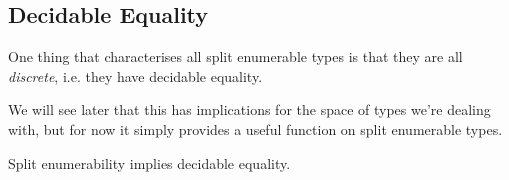 \subsection{Decidable Equality}
One thing that characterises all split enumerable types is that they are all
\emph{discrete}, i.e. they have decidable equality.  
\begin{multicols}{2}  \null \vfill
  \begin{agdalisting}
  \end{agdalisting} \vfill \null \columnbreak
  \begin{agdalisting}
  \end{agdalisting}
\end{multicols} \vspace{-\baselineskip} \noindent
We will see later that this has implications for the space of types we're
dealing with, but for now it simply provides a useful function on split
enumerable types.
\begin{lemma} 
  Split enumerability implies decidable equality.
\end{lemma}
